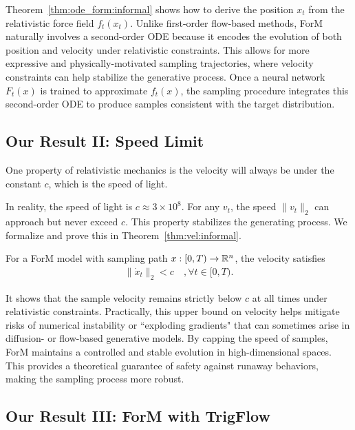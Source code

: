 Theorem~\ref{thm:ode_form:informal} shows how to derive the position $x_t$ from the relativistic force field $f_t(x_t)$. Unlike first-order flow-based methods, ForM naturally involves a second-order ODE because it encodes the evolution of both position and velocity under relativistic constraints. This allows for more expressive and physically-motivated sampling trajectories, where velocity constraints can help stabilize the generative process. Once a neural network $F_t(x)$ is trained to approximate $f_t(x)$, the sampling procedure integrates this second-order ODE to produce samples consistent with the target distribution.


\subsection{Our Result II: Speed Limit} \label{sub:speed_limit}

One property of relativistic mechanics is the velocity will always be under the constant $c$, which is the speed of light.

In reality, the speed of light is $c \approx 3 \times 10^8$. For any $v_t$, the speed $ \|v_t\|_2$ can approach but never exceed $c$. 
This property stabilizes the generating process. We formalize and prove this in Theorem~\ref{thm:vel:informal}.

\begin{theorem} \label{thm:vel:informal}
For a ForM model with sampling path $x : [0,T) \to \mathbb{R}^n$, the velocity satisfies
\begin{align*}
\| \dot{x}_t \|_2 < c \quad, \forall t \in [0,T).
\end{align*}
\end{theorem}


It shows that the sample velocity remains strictly below $c$ at all times under relativistic constraints. Practically, this upper bound on velocity helps mitigate risks of numerical instability or ``exploding gradients" that can sometimes arise in diffusion- or flow-based generative models. By capping the speed of samples, ForM maintains a controlled and stable evolution in high-dimensional spaces. This provides a theoretical guarantee of safety against runaway behaviors, making the sampling process more robust.



\subsection{Our Result III: ForM with TrigFlow} \label{sub:form_trig}

